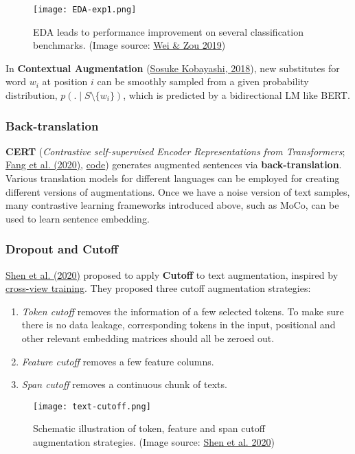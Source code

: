 \documentclass[12pt]{article}
\begin{document}
\begin{figure}[H]
    \centering
    \texttt{[image: EDA-exp1.png]}
    \caption{EDA leads to performance improvement on several classification benchmarks. (Image source: \href{https://arxiv.org/abs/1901.11196}{Wei \& Zou 2019})}
\end{figure}

In \textbf{Contextual Augmentation} (\href{https://arxiv.org/abs/1805.06201}{Sosuke Kobayashi, 2018}), new substitutes for word $w_i$ at position $i$ can be smoothly sampled from a given probability distribution, $p(.\mid S\setminus\{w_i\})$, which is predicted by a bidirectional LM like BERT.

\subsubsection{Back-translation}
\textbf{CERT} (\emph{Contrastive self-supervised Encoder Representations from Transformers}; \href{https://arxiv.org/abs/2005.12766}{Fang et al. (2020)}, \href{https://github.com/UCSD-AI4H/CERT}{code}) generates augmented sentences via \textbf{back-translation}. Various translation models for different languages can be employed for creating different versions of augmentations. Once we have a noise version of text samples, many contrastive learning frameworks introduced above, such as MoCo, can be used to learn sentence embedding.

\subsubsection{Dropout and Cutoff}
\href{https://arxiv.org/abs/2009.13818}{Shen et al. (2020)} proposed to apply \textbf{Cutoff} to text augmentation, inspired by \href{https://lilianweng.github.io/posts/2019-01-31-lm/#cross-view-training}{cross-view training}. They proposed three cutoff augmentation strategies:
\begin{enumerate}
    \item \emph{Token cutoff} removes the information of a few selected tokens. To make sure there is no data leakage, corresponding tokens in the input, positional and other relevant embedding matrices should all be zeroed out.
    \item \emph{Feature cutoff} removes a few feature columns.
    \item \emph{Span cutoff} removes a continuous chunk of texts.
\end{enumerate}

\begin{figure}[H]
    \centering
    \texttt{[image: text-cutoff.png]}
    \caption{Schematic illustration of token, feature and span cutoff augmentation strategies. (Image source: \href{https://arxiv.org/abs/2009.13818}{Shen et al. 2020})}
\end{figure}
\end{document}
